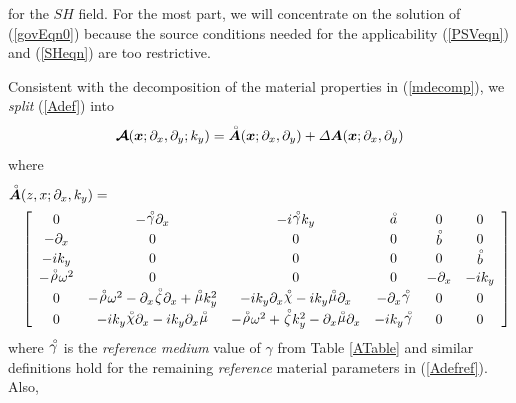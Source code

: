 for the $SH$ field.
For the most part, we will concentrate on the solution of (\ref{govEqn0}) 
because the source conditions needed for the applicability (\ref{PSVeqn}) and (\ref{SHeqn})
are too restrictive.




Consistent with the decomposition of the material properties in (\ref{mdecomp}), we
 {\em split\/} (\ref{Adef}) into
\begin{equation} \label{Asplit}
{\mbox{\boldmath$\cal A$\unboldmath}}({\mbox{\boldmath$\mit x$\unboldmath}};{\partial }_{x},{\partial }_{y};k_y)=
{\stackrel{\scriptscriptstyle _{\,\,\circ}}{ \mbox{\boldmath$\mit A$\unboldmath}}}({\mbox{\boldmath$\mit x$\unboldmath}};{\partial }_{x},{\partial }_{y})
+{{\mit \Delta} {\mbox{\boldmath$\mit A$\unboldmath}}}({\mbox{\boldmath$\mit x$\unboldmath}};{\partial }_{x},{\partial }_{y}) 
\end{equation}
where
\begin{eqnarray} \label{Adefref}
\lefteqn{
{\rf{\bmi A}}(z,x;{\partial }_{x},{k}_{y})
=}\nonumber\\
&&\left[{\begin{array}{cccccc}
0&- {\rf \gamma} {\partial }_{  x}&  -i {\rf \gamma} {  k}_{  y}&  {\rf a}&0&0\\ -{ \partial 
}_{x}&0&0&0&{\rf b}&0\\ -i{k}_{y}&0&0&0&0&{\rf b}\\ - {\rf \rho} {\omega }^{  
2}&  0&0&0&-{ \partial }_{x}&-i{k}_{y}\\ 0&- {\rf \rho} {\omega 
}^{  2}  -{ \partial }_{x} {\rf \zeta} {\partial }_{  
x}  + {\rf \mu} {  k}_{  y}^{  2}&  
-i{k}_{y}{ \partial }_{x} {\rf \chi}   -i{k}_{y} {\rf \mu} {\partial 
}_{  x}&  -{ \partial }_{x} {\rf \gamma} &  0&0\\ 
0&-i{k}_{y} {\rf \chi} {\partial }_{  x}  -i{k}_{y}{ \partial 
}_{x} {\rf \mu} &  - {\rf \rho} {\omega }^{  2}  + {\rf \zeta }
{  k}_{  y}^{  2}  -{ \partial }_{x} {\rf \mu} 
{\partial }_{  x}&  -i{k}_{y} {\rf \gamma} &  
0&0\end{array}}\right]
\end{eqnarray}
where ${\stackrel{\scriptscriptstyle _{\,\,\circ}}{ \gamma}}$ is the {\em reference medium\/} value of ${\gamma}$
from Table \ref{ATable} and similar definitions hold for the remaining 
{\em reference\/} material parameters 
in (\ref{Adefref}). Also,
